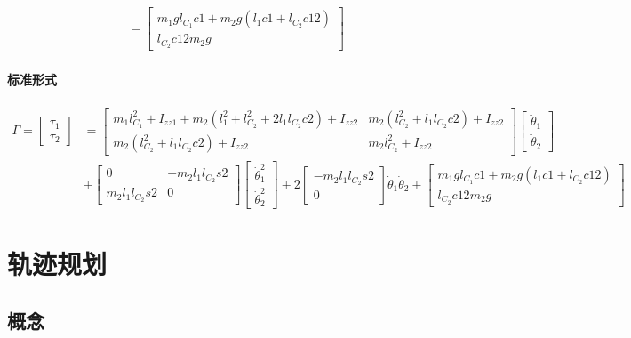 \documentclass[
12pt, %
a4paper, 
oneside, %
headinclude,footinclude, %
]{scrartcl}
\begin{document}
{\begin{enumerate}
\begin{align*}
&= \begin{bmatrix} m_1 g l_{C_1}c1 + m_2 g(l_1 c1 + l_{C_2}c12) \\ l_{C_2}c12 m_2 g \end{bmatrix}
\end{align*}
\end{enumerate}
\paragraph{标准形式}
\begin{align*}
\Gamma = \begin{bmatrix} \tau_1 \\ \tau_2 \end{bmatrix}
&= \begin{bmatrix} 
m_1 l_{C_1}^2 + I_{zz1} + m_2(l_1^2 + l_{C_2}^2 + 2l_1 l_{C_2}c2) + I_{zz2} & m_2(l_{C_2}^2 + l_1 l_{C_2}c2) + I_{zz2} \\
m_2(l_{C_2}^2 + l_1 l_{C_2}c2) + I_{zz2} & m_2 l_{C_2}^2 + I_{zz2}
\end{bmatrix} 
\begin{bmatrix} \ddot{\theta}_1 \\ \ddot{\theta}_2 \end{bmatrix} \\  
&+ \begin{bmatrix} 0 & -m_2 l_1 l_{C_2}s2 \\ m_2 l_1 l_{C_2}s2 & 0 \end{bmatrix} \begin{bmatrix} \dot{\theta}_1^2 \\ \dot{\theta}_2^2 \end{bmatrix}
+ 2\begin{bmatrix} -m_2 l_1 l_{C_2}s2 \\ 0 \end{bmatrix} \dot{\theta}_1 \dot{\theta}_2 
+ \begin{bmatrix} m_1 g l_{C_1}c1 + m_2 g(l_1 c1 + l_{C_2}c12) \\ l_{C_2}c12 m_2 g \end{bmatrix} 
\end{align*}
}
\section{轨迹规划}
\subsection[概念]{概念}
\end{document}
